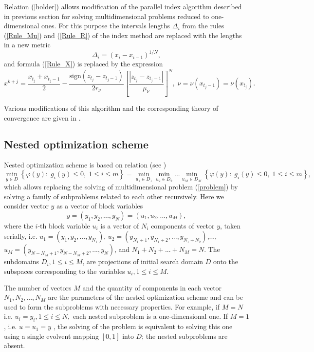 \documentclass[a4paper]{jpconf}
\begin{document}
Relation (\ref{holder}) allows modification of the parallel index algorithm described in previous section for solving multidimensional problems reduced to one-dimensional ones. For this purpose the intervals lengths $\Delta_i$ from the rules (\ref{Rule_Mu}) and (\ref{Rule_R}) of the index method are replaced with the lengths in a new metric
\[
\Delta_i = \left(x_i-x_{i-1}\right)^{1/N},
\]
and formula (\ref{Rule_X}) is replaced by the expression
\[
x^{k+j} = \frac{x_{t_j}+x_{t_j-1}}{2} - \frac{\mathrm{sign}(z_{t_j}-z_{t_j-1})}{2r_\nu}\left[\frac{\left|z_{t_j}-z_{t_j-1}\right|}{\mu_\nu}\right]^N, \; \nu=\nu(x_{t_j-1})=\nu(x_{t_j}).
\]

Various modifications of this algorithm and the corresponding theory of convergence are given in \cite{Strongin2000,Strongin2013,Gergel2005}.


\subsection{Nested optimization scheme}

Nested optimization scheme is based on relation (see \cite{Strongin2013})
\[
\min_{y \in D}{\left\{\varphi(y): \; g_i(y)\leq 0, \; 1 \leq i \leq 
m\right\}}= \min_{u_1\in D_1}\min_{u_2\in D_2}...\min_{u_M\in D_M 
}{\left\{\varphi(y): \; g_i(y)\leq 0, \; 1 \leq i \leq m\right\}},
\]
which allows replacing the solving of multidimensional problem 
(\ref{problem}) by solving a family of subproblems related to each other 
recursively.
Here we consider vector $y$ as a vector of block variables
\[
y=(y_1,y_2,...,y_N)=(u_1,u_2,...,u_M),
\]
where the $i$-th block variable $u_i$ is a vector of $N_i$ components of 
vector $y$, taken serially, i.e. $u_1=(y_1,y_2,...,y_{N_1})$, 
$u_2=(y_{N_1+1},y_{N_1+2},...,y_{N_1+N_2})$,..., $u_M=(y_{N-N_M+1},y_{N-
N_M+2},...,y_{N})$, and $N_1+N_2+...+N_M=N$. 
The subdomains $D_i, 1 \leq i \leq M$, are projections of initial search 
domain $D$ onto the subspaces corresponding to the variables $u_i, 1 \leq i 
\leq M$.

The number of vectors $M$ and the quantity of components in each vector $N_1, N_2,...,N_M$ are the parameters of the nested optimization scheme and can be used to form the subproblems with necessary properties. For example, if  $M=N$ i.e. $u_i=y_i, 1\leq i \leq N,$ each nested subproblem is a one-dimensional one. If $M=1$, i.e. $u=u_1=y$ , the solving of the problem is equivalent to solving this one using a single evolvent mapping $[0,1]$ into $D$; the nested subproblems are absent. 
\end{document}
